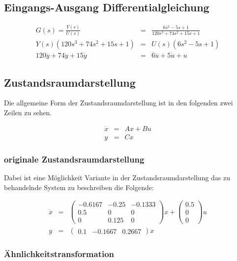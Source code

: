 \subsection{Eingangs-Ausgang Differentialgleichung}

\begin{eqnarray*}
    G(s) =\frac{Y(s)}{U(s)} &=& \frac{6s^2 - 5s + 1}{120s^3 + 74s^2 + 15s +1} \\
    Y(s)(120s^3 + 74s^2 + 15s +1) &=& U(s) (6s^2 - 5s + 1) \\
    120 \dddot y + 74 \ddot y + 15 \dot y &=& 6 \ddot u + 5 \dot u + u
\end{eqnarray*}

\subsection{Zustandsraumdarstellung}

Die allgemeine Form der Zustandsraumdarstellung ist in den folgenden zwei Zeilen zu sehen.

\begin{eqnarray*}
    \dot x &=& Ax + Bu \nonumber \\
    y &=& Cx
\end{eqnarray*}

\subsubsection{originale Zustandsraumdarstellung}

Dabei ist eine Möglichkeit Variante in der Zustandsraumdarstellung das zu behandelnde System zu beschreiben die Folgende:

\begin{eqnarray*}
    \dot x &=& \left(\begin{array}{ccc} -0.6167 & -0.25 & -0.1333\\ 0.5 & 0 & 0\\ 0 & 0.125 & 0 \end{array}\right) x + \left(\begin{array}{c} 0.5\\ 0\\ 0 \end{array}\right) u  \nonumber \\
    y &=& \left(\begin{array}{ccc} 0.1 & -0.1667 & 0.2667 \end{array}\right) x
\end{eqnarray*}

\subsubsection{Ähnlichkeitstransformation}


